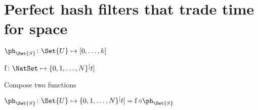 \documentclass[ ../main.tex]{subfiles}
\begin{document}
\section{Perfect hash filters that trade time for space}

$\ph_{\Set{S}} \colon \Set{U} \mapsto [0,\ldots,k]$

$\operatorname{f} \colon \NatSet \mapsto \{0,1,\ldots,N\}^[t]$

Compose two functions

$\ph_{\Set{S}} \colon \Set{U} \mapsto \{0,1,\ldots,N\}^[t] = \operatorname{f} \circ \ph_{\Set{S}}$
\end{document}

